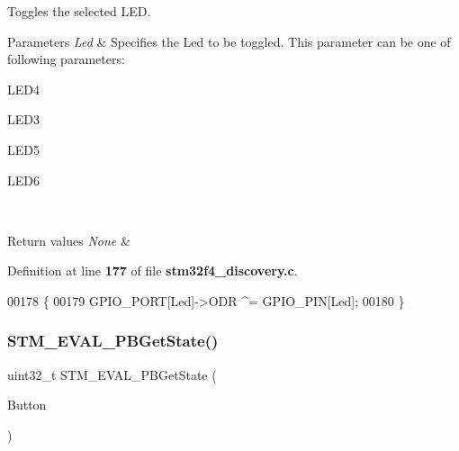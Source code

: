 Toggles the selected L\+ED. 


\begin{DoxyParams}{Parameters}
{\em Led} & Specifies the Led to be toggled. This parameter can be one of following parameters\+: \begin{DoxyItemize}
\item L\+E\+D4 \item L\+E\+D3 \item L\+E\+D5 \item L\+E\+D6 \end{DoxyItemize}
\\
\hline
\end{DoxyParams}

\begin{DoxyRetVals}{Return values}
{\em None} & \\
\hline
\end{DoxyRetVals}


Definition at line \textbf{ 177} of file \textbf{ stm32f4\+\_\+discovery.\+c}.


\begin{DoxyCode}
00178 \{
00179   GPIO_PORT[Led]->ODR ^= GPIO_PIN[Led];
00180 \}
\end{DoxyCode}
\mbox{\label{group__STM32F4__DISCOVERY__LOW__LEVEL__Private__Functions_ga812ee2a84aaed235587ac81eb9269442}} 
\subsubsection{S\+T\+M\+\_\+\+E\+V\+A\+L\+\_\+\+P\+B\+Get\+State()}
{\footnotesize\ttfamily uint32\+\_\+t S\+T\+M\+\_\+\+E\+V\+A\+L\+\_\+\+P\+B\+Get\+State (\begin{DoxyParamCaption}\item[{\textbf{ Button\+\_\+\+Type\+Def}}]{Button }\end{DoxyParamCaption})}



